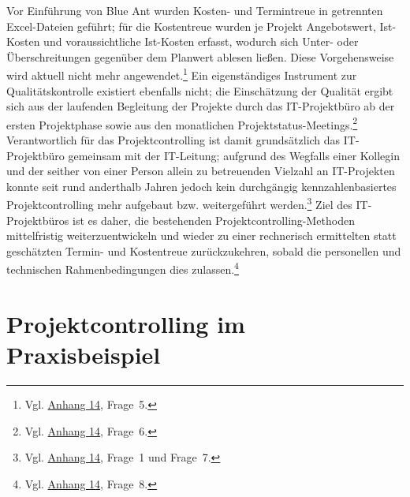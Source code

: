 \documentclass[
    12pt, 
    a4paper,
    ]{scrartcl} %
\begin{document}
Vor Einführung von Blue Ant wurden Kosten- und Termintreue in getrennten Excel-Dateien geführt; für die Kostentreue wurden je Projekt Angebotswert, Ist-Kosten und voraussichtliche Ist-Kosten erfasst, wodurch sich Unter- oder Überschreitungen gegenüber dem Planwert ablesen ließen. Diese Vorgehensweise wird aktuell nicht mehr angewendet.\footnote{Vgl. \hyperref[sec:Anhang14]{Anhang 14}, Frage~5.} Ein eigenständiges Instrument zur Qualitätskontrolle existiert ebenfalls nicht; die Einschätzung der Qualität ergibt sich aus der laufenden Begleitung der Projekte durch das IT-Projektbüro ab der ersten Projektphase sowie aus den monatlichen Projektstatus-Meetings.\footnote{Vgl. \hyperref[sec:Anhang14]{Anhang 14}, Frage~6.} Verantwortlich für das Projektcontrolling ist damit grundsätzlich das IT-Projektbüro gemeinsam mit der IT-Leitung; aufgrund des Wegfalls einer Kollegin und der seither von einer Person allein zu betreuenden Vielzahl an IT-Projekten konnte seit rund anderthalb Jahren jedoch kein durchgängig kennzahlenbasiertes Projektcontrolling mehr aufgebaut bzw. weitergeführt werden.\footnote{Vgl. \hyperref[sec:Anhang14]{Anhang 14}, Frage~1 und Frage~7.} Ziel des IT-Projektbüros ist es daher, die bestehenden Projektcontrolling-Methoden mittelfristig weiterzuentwickeln und wieder zu einer rechnerisch ermittelten statt geschätzten Termin- und Kostentreue zurückzukehren, sobald die personellen und technischen Rahmenbedingungen dies zulassen.\footnote{Vgl. \hyperref[sec:Anhang14]{Anhang 14}, Frage~8.}

\section{Projektcontrolling im Praxisbeispiel}
\end{document}
